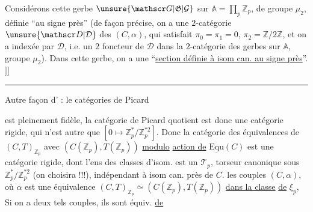 
Considérons cette gerbe $\unsure{\mathscr G|\mathfrak G|\mathcal G}$  sur $\mathbb A=\prod_p\mathbb Z_p$, de
groupe $\mu_2$, définie ``au signe près'' (de
façon précise, on a une $2$-catégorie $\unsure{\mathscr D|\mathcal D}$ des $(C,\alpha)$,
qui satisfait $\pi_0=\pi_1=0$, $\pi_2=\mathbb Z/2\mathbb Z$, et  on
a   indexée par $\mathscr D$, i.e. un $2$ foncteur
de $\mathscr D$ dans la $2$-catégorie des  gerbes sur $\mathbb A$,
groupe $\mu_2$). Dans cette gerbe, on a une
``\uline{section définie à isom can. au signe près}''. $]]$


\noindent\rule{2cm}{0.4pt}
Autre façon d' : le  
catégories de Picard 


est pleinement fidèle, la catégorie de Picard quotient est
donc une catégorie rigide, qui n'est autre que
$[0\mapsto\mathbb Z_p^*/\mathbb Z_p^{*2}]$. Donc la catégorie des équivalences de
$(C,T)_{\mathbb Z_p}$ avec $(C(\mathbb Z_p),T(\mathbb Z_p))$ \deleted{\unsure{$\to$}} \uline{modulo} \uline{action de} $\underline{\mathrm{Equ}}(C)$
est une catégorie rigide,  dont l'ens des
classes d'isom. est un $\mathcal T_p$, torseur canonique sous
$\mathbb Z_p^*/\mathbb Z_p^{*2}$ (on choisira !!!), indépendant à isom
can. près de $C$.  
 les
couples $(C,\alpha)$, où  $\alpha$ est une équivalence
$(C,T)_{\mathbb Z_p}\simeq(C(\mathbb Z_p),T(\mathbb Z_p))$ \uline{dans la classe} \uline{de} $\xi_p$, 
 Si on a deux tels couples, ils sont
 équiv. \uline{de} 
